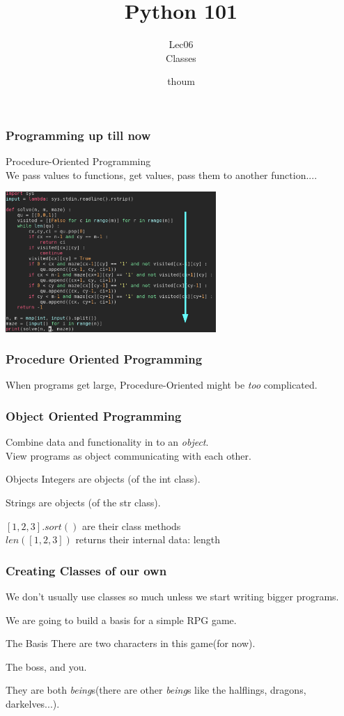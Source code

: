 \documentclass{beamer}
\title{Python 101}
\subtitle{Lec06 \\ Classes}
\author{thoum}
\begin{document}
\frame{\titlepage}

\begin{frame}
\frametitle{Programming up till now}
Procedure-Oriented Programming\\
We pass values to functions, get values, pass them to another function....
  \begin{center}
  \includegraphics[width=80mm]{./code.png}
  \end{center}
\end{frame}

\begin{frame}
\frametitle{Procedure Oriented Programming}
  When programs get large, Procedure-Oriented might be \textit{too}
  complicated.\\
\end{frame}

\begin{frame}
\frametitle{Object Oriented Programming}
  Combine data and functionality in to an \textit{object}.\\
  View programs as object communicating with each other.
\end{frame}

\begin{frame}{Objects}
  Integers are objects (of the int class).

  Strings are objects (of the str class).

  $[1,2,3].sort()$ are their class methods\\
  $len([1,2,3])$ returns their internal data: length
\end{frame}

\begin{frame}
\frametitle{Creating Classes of our own}
  We don't usually use classes so much unless we start writing bigger programs.

  We are going to build a basis for a simple RPG game.
\end{frame}

\begin{frame}{The Basis}
  There are two characters in this game(for now).

  The boss, and you.

  They are both \textit{being}s(there are other \textit{being}s like the halflings,
  dragons, darkelves...).
\end{frame}
\end{document}
